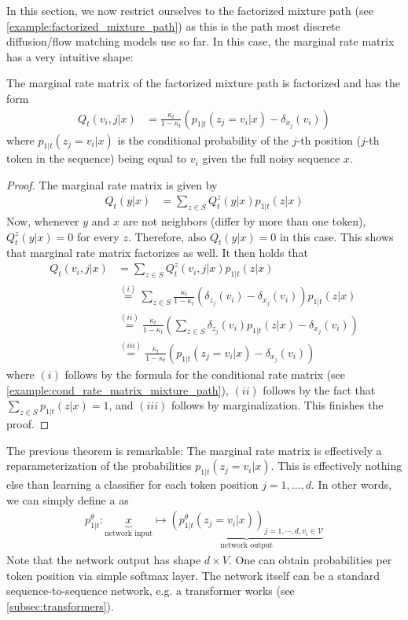 In this section, we now restrict ourselves to the factorized mixture path (see \cref{example:factorized_mixture_path}) as this is the path most discrete diffusion/flow matching models use so far. In this case, the marginal rate matrix has a very intuitive shape:
\begin{theorem}
The marginal rate matrix of the factorized mixture path is factorized and has the form
\begin{align*}
Q_t(v_i,j|x)&=\frac{\dot{\kappa}_t}{1-\kappa_t}(p_{1|t}(z_j=v_i|x)-\delta_{x_j}(v_i))
\end{align*}
where $p_{1|t}(z_j=v_i|x)$ is the conditional probability of the $j$-th position ($j$-th token in the sequence) being equal to $v_i$ given the full noisy sequence $x$.
\end{theorem}
\begin{proof}
The marginal rate matrix is given by
\begin{align}
Q_t(y|x)&=\sum\limits_{z\in S}Q_t^z(y|x)p_{1|t}(z|x)
\end{align}
Now, whenever $y$ and $x$ are not neighbors (differ by more than one token), $Q_t^z(y|x)=0$ for every $z$. Therefore, also $Q_t(y|x)=0$ in this case. This shows that marginal rate matrix factorizes as well. It then holds that 
\begin{align}
Q_t(v_i,j|x)&=\sum\limits_{z\in S}Q_t^z(v_i,j|x)p_{1|t}(z|x)\\
&\overset{(i)}{=}\sum\limits_{z\in S}\frac{\dot{\kappa}_t}{1-\kappa_t}(\delta_{z_j}(v_i)-\delta_{x_j}(v_i))p_{1|t}(z|x)\\
&\overset{(ii)}{=}\frac{\dot{\kappa}_t}{1-\kappa_t}\left(\sum\limits_{z\in S}\delta_{z_j}(v_i)p_{1|t}(z|x)-\delta_{x_j}(v_i)\right)\\
&\overset{(iii)}{=}\frac{\dot{\kappa}_t}{1-\kappa_t}\left(p_{1|t}(z_j=v_i|x)-\delta_{x_j}(v_i)\right)
\end{align}
where $(i)$ follows by the formula for the conditional rate matrix (see \cref{example:cond_rate_matrix_mixture_path}), $(ii)$ follows by the fact that $\sum_{z\in S}p_{1|t}(z|x)=1$, and $(iii)$ follows by marginalization. This finishes the proof.
\end{proof}
The previous theorem is remarkable: The marginal rate matrix is effectively a reparameterization of the probabilities $p_{1|t}(z_j=v_i|x)$. This is effectively nothing else than learning a classifier for each token position $j=1,\dots,d$. In other words, we can simply define a  as
\begin{align*}
p_{1|t}^\theta:\underbrace{x}_{\text{network input}}\mapsto\underbrace{(p_{1|t}^\theta(z_j=v_i|x))_{j=1,\cdots,d, v_i\in \mathcal{V}}}_{\text{network output}}
\end{align*}
Note that the network output has shape $d\times V$. One can obtain probabilities per token position via  simple softmax layer. The network itself can be a standard sequence-to-sequence network, e.g. a transformer works (see \cref{subsec:transformers}).

